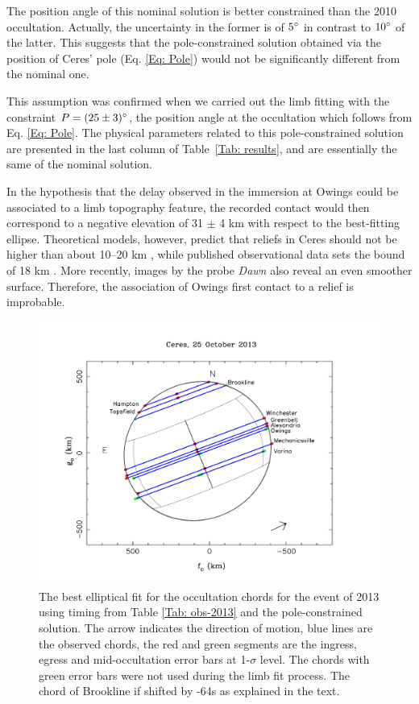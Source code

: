 \documentclass[useAMS,usenatbib]{mn2e}
\begin{document}
The position angle of this nominal solution is better constrained than the 2010 occultation. Actually, the uncertainty in the former is of $5\hbox{$^\circ$}$ in contrast to $10\hbox{$^\circ$}$ of the latter. This suggests that the pole-constrained solution obtained via the position of Ceres' pole (Eq. \ref{Eq: Pole}) would not be significantly different from the nominal one.

This assumption was confirmed when we carried out the limb fitting with the constraint $P = (25 \pm 3)\hbox{$^\circ$}$, the position angle at the occultation which follows from Eq. \ref{Eq: Pole}. The physical parameters related to this pole-constrained solution are presented in the last column of Table~\ref{Tab: results}, and are essentially the same of the nominal solution.

In the hypothesis that the delay observed in the immersion at Owings could be associated to a limb topography feature, the recorded contact would then correspond to a negative elevation of 31 $\pm$ 4 km with respect to the best-fitting ellipse. Theoretical models, however, predict that reliefs in Ceres should not be higher than about 10--20 km \citep{Johnson1973}, while published observational data sets the bound of 18 km \citep{Carry2008}. More recently, images by the probe \textit{Dawn} also reveal an even smoother surface. Therefore, the association of Owings first contact to a relief is improbable.

\begin{figure}
\includegraphics[scale=0.36]{figures/Ceres_2013_sphere.pdf}
\caption{The best elliptical fit for the occultation chords for the event of 2013 using timing from Table \ref{Tab: obs-2013} and the pole-constrained solution.  The arrow indicates the direction of motion, blue lines are the observed chords, the red and green segments are the ingress, egress and mid-occultation error bars at 1-$\sigma$ level. The chords with green error bars were not used during the limb fit process. The chord of Brookline if shifted by -64s as explained in the text.\label{Fig: Ceres-2013-body}}
\end{figure}
\end{document}
